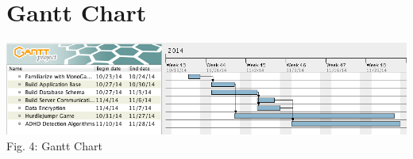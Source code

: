 \documentclass[a4wide]{article}
\begin{document}
\section{Gantt Chart}
\includegraphics[width=\textwidth]{images/Gantt.png}
Fig. 4: Gantt Chart
\end{document}
